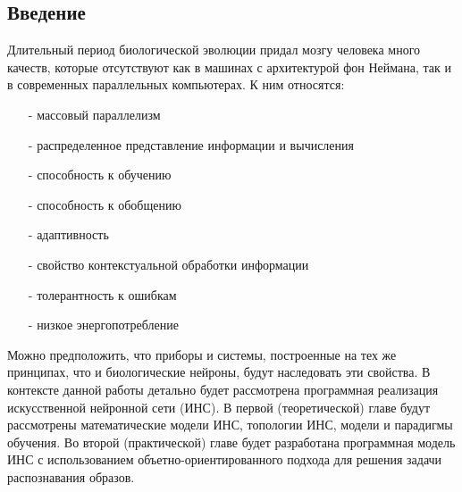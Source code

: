 \begin{center}
\section*{Введение}
\end{center}


Длительный период биологической эволюции придал мозгу человека много качеств, которые отсутствуют как в машинах с архитектурой фон Неймана, так и в современных параллельных компьютерах.
К ним относятся:
\begin{itemize}
\item[-] массовый параллелизм
\item[-] распределенное представление информации и вычисления
\item[-] способность к обучению
\item[-] способность к обобщению
\item[-] адаптивность
\item[-] свойство контекстуальной обработки информации
\item[-] толерантность к ошибкам
\item[-] низкое энергопотребление
\end{itemize}
Можно предположить, что приборы и системы, построенные на тех же принципах, что и биологические нейроны, будут наследовать эти свойства.
В контексте данной работы детально будет рассмотрена программная реализация искусственной нейронной сети (ИНС).
В первой (теоретической) главе будут рассмотрены математические модели ИНС, топологии ИНС, модели и парадигмы обучения.
Во второй (практической) главе будет разработана программная модель ИНС с использованием объетно-ориентированного подхода для решения задачи распознавания образов.


\newpage